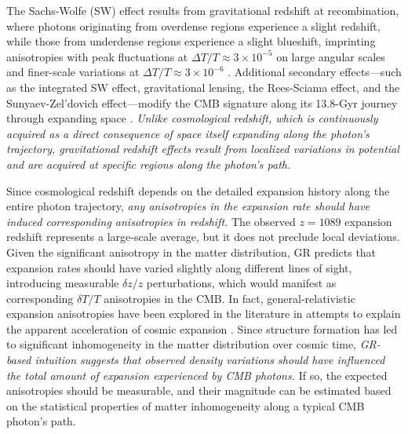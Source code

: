 \documentclass[aps,prd,reprint,superscriptaddress]{revtex4-2}
\begin{document}
The Sachs-Wolfe (SW) effect \cite{Sachs1967} results from gravitational redshift at recombination, where photons originating from overdense regions experience a slight redshift, while those from underdense regions experience a slight blueshift, imprinting anisotropies with peak fluctuations at $\Delta T/T \approx 3 \times 10^{-5}$ on large angular scales and finer-scale variations at $\Delta T/T \approx 3 \times 10^{-6}$ \cite{Smoot1992, Bennett2003, Aghanim2020b}. Additional secondary effects---such as the integrated SW effect, gravitational lensing, the Rees-Sciama effect, and the Sunyaev-Zel'dovich effect---modify the CMB signature along its 13.8-Gyr journey through expanding space \cite{Ade2016, Lewis2006, Rees1968, Crittenden1996, Sunyaev1970, Sunyaev1972}. \textit{Unlike cosmological redshift, which is continuously acquired as a direct consequence of space itself expanding along the photon's trajectory, gravitational redshift effects result from localized variations in potential and are acquired at specific regions along the photon's path.}

Since cosmological redshift depends on the detailed expansion history along the entire photon trajectory, \textit{any anisotropies in the expansion rate should have induced corresponding anisotropies in redshift.} The observed $z=1089$ expansion redshift represents a large-scale average, but it does not preclude local deviations. Given the significant anisotropy in the matter distribution, GR predicts that expansion rates should have varied slightly along different lines of sight, introducing measurable $\delta z/z$ perturbations, which would manifest as corresponding $\delta T/T$ anisotropies in the CMB. In fact, general-relativistic expansion anisotropies have been explored in the literature in attempts to explain the apparent acceleration of cosmic expansion \cite{Wiltshire2009, Seifert2025}. Since structure formation has led to significant inhomogeneity in the matter distribution over cosmic time, \textit{GR-based intuition suggests that observed density variations should have influenced the total amount of expansion experienced by CMB photons.} If so, the expected anisotropies should be measurable, and their magnitude can be estimated based on the statistical properties of matter inhomogeneity along a typical CMB photon's path.
\end{document}
